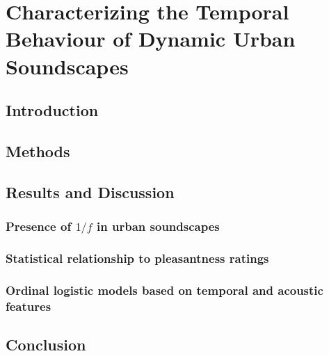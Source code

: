 \chapter{Characterizing the Temporal Behaviour of Dynamic Urban Soundscapes}
\label{ch:temp}

\section{Introduction}

\section{Methods}

\section{Results and Discussion}
  \subsection{Presence of $1/f$ in urban soundscapes}
  \subsection{Statistical relationship to pleasantness ratings}
  \subsection{Ordinal logistic models based on temporal and acoustic features}

\section{Conclusion}
